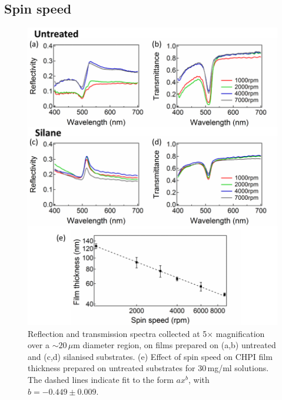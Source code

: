 \subsection{Spin speed}
\begin{figure}[] 
\centering    
\includegraphics[width=\textwidth]{Fig6}
\caption{Reflection and transmission spectra collected at 5$\times$ magnification over a $\sim20\,\mu$m diameter region, on films prepared on (a,b) untreated and (c,d) silanised substrates. (e) Effect of spin speed on CHPI film thickness prepared on untreated substrates for 30\,mg/ml solutions. The dashed lines indicate fit to the form $ax^b$, with $b=-0.449\pm0.009$.}
\label{4Fig6}
\end{figure}
